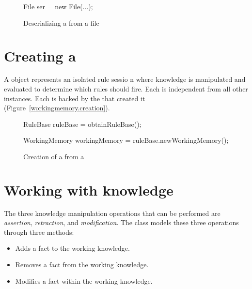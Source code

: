\begin{figure}
\begin{javaCodelisting}
File ser = new File(...);
\end{javaCodelisting}
\caption{Deserializing a  from a file}
\label{rulebase.deserialize}
\end{figure}

\section{Creating a }

A  object represents an isolated rule
sessio n where knowledge is manipulated and evaluated to determine
which rules should fire.  Each  is independent
from all other instances. Each  is backed by the
 that created it
(Figure~\vref{workingmemory.creation}).

\begin{figure}
\begin{javaCodelisting}
RuleBase ruleBase = obtainRuleBase();

WorkingMemory workingMemory = ruleBase.newWorkingMemory();
\end{javaCodelisting}
\caption{Creation of a  from a
}
\label{workingmemory.creation}
\end{figure}

\section{Working with knowledge}

The three knowledge manipulation operations that can be performed
are \emph{assertion},
\emph{retraction}, and
\emph{modification}.  The
 class models these three operations
through three methods:

\begin{itemize}
  \item {} Adds a fact to 
    the working knowledge.
  \item {} Removes a fact
    from the working knowledge.
  \item {} Modifies a
    fact within the working knowledge.
\end{itemize}

